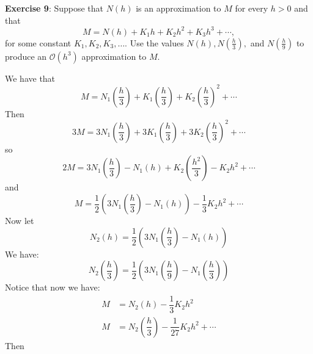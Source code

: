 \documentclass{article}
\begin{document}
\textbf{Exercise 9}: Suppose that $N(h)$ is an approximation to $M$ for every $h > 0$ and that
    \begin{equation*}
        M = N(h) + K_{1}h + K_{2}h^{2} + K_{3}h^{3} + \cdots,
    \end{equation*}
for some constant $K_{1}, K_{2}, K_{3}, \ldots$. Use the values $N(h), N(\frac{h}{3}),$ and $N(\frac{h}{9})$ to produce an $\mathcal{O}(h^{3})$ approximation to $M$.
    \begin{answer}
        We have that
            \begin{equation*}
                M = N_{1}\left(\dfrac{h}{3}\right) + K_{1}\left(\dfrac{h}{3}\right) + K_{2} \left(\dfrac{h}{3}\right)^{2} + \cdots
            \end{equation*}
        Then
            \begin{equation*}
                3M = 3N_{1}\left(\dfrac{h}{3}\right) + 3K_{1}\left(\dfrac{h}{3}\right) + 3K_{2}\left(\dfrac{h}{3}\right)^{2} + \cdots
            \end{equation*}
        so
            \begin{equation*}
                2M = 3N_{1}\left(\dfrac{h}{3}\right) - N_{1}(h) + K_{2}\left(\dfrac{h^{2}}{3}\right) - K_{2}h^{2} + \cdots
            \end{equation*}
        and
            \begin{equation*}
                M = \dfrac{1}{2}\left(3N_{1}\left(\dfrac{h}{3}\right) - N_{1}(h)\right) - \dfrac{1}{3}K_{2}h^{2} + \cdots
            \end{equation*}
        Now let
            \begin{equation*}
                N_{2}(h) = \dfrac{1}{2}\left(3N_{1}\left(\dfrac{h}{3}\right) - N_{1}(h)\right)
            \end{equation*}
        We have:
            \begin{equation*}
                N_{2}\left(\dfrac{h}{3}\right) = \dfrac{1}{2}\left(3N_{1}\left(\dfrac{h}{9}\right) - N_{1}\left(\dfrac{h}{3}\right)\right)
            \end{equation*}
        Notice that now we have:
            \begin{align*}
                M &= N_{2}(h) - \dfrac{1}{3}K_{2}h^{2}                                 \\
                M &= N_{2}\left(\dfrac{h}{3}\right) - \dfrac{1}{27}K_{2}h^{2} + \cdots   
            \end{align*}
        Then
            \begin{equation*}

\end{equation*}
\end{answer}
\end{document}
